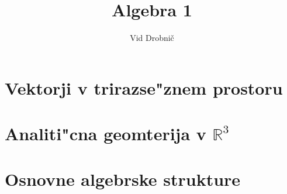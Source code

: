 \documentclass[a4paper, 12pt]{article}
\title{Algebra 1}
\author{Vid Drobnič}
\date{}
\begin{document}
	\maketitle
	\thispagestyle{empty}
	\pagebreak
	\setcounter{page}{1}
	
	\tableofcontents
	\pagebreak
	
	\section{Vektorji v trirazse"znem prostoru}
	
	
	\section{Analiti"cna geomterija v $\mathbb{R}^3$}
	
	
	\section{Osnovne algebrske strukture}
	
\end{document}

